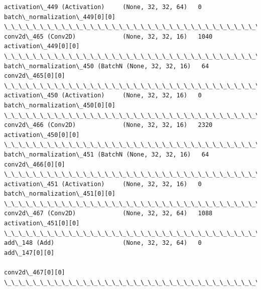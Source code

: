 \documentclass[11pt]{article}
\begin{document}
\begin{Verbatim}[commandchars=\\\{\}]
activation\_449 (Activation)     (None, 32, 32, 64)   0           batch\_normalization\_449[0][0]    
\_\_\_\_\_\_\_\_\_\_\_\_\_\_\_\_\_\_\_\_\_\_\_\_\_\_\_\_\_\_\_\_\_\_\_\_\_\_\_\_\_\_\_\_\_\_\_\_\_\_\_\_\_\_\_\_\_\_\_\_\_\_\_\_\_\_\_\_\_\_\_\_\_\_\_\_\_\_\_\_\_\_\_\_\_\_\_\_\_\_\_\_\_\_\_\_\_\_
conv2d\_465 (Conv2D)             (None, 32, 32, 16)   1040        activation\_449[0][0]             
\_\_\_\_\_\_\_\_\_\_\_\_\_\_\_\_\_\_\_\_\_\_\_\_\_\_\_\_\_\_\_\_\_\_\_\_\_\_\_\_\_\_\_\_\_\_\_\_\_\_\_\_\_\_\_\_\_\_\_\_\_\_\_\_\_\_\_\_\_\_\_\_\_\_\_\_\_\_\_\_\_\_\_\_\_\_\_\_\_\_\_\_\_\_\_\_\_\_
batch\_normalization\_450 (BatchN (None, 32, 32, 16)   64          conv2d\_465[0][0]                 
\_\_\_\_\_\_\_\_\_\_\_\_\_\_\_\_\_\_\_\_\_\_\_\_\_\_\_\_\_\_\_\_\_\_\_\_\_\_\_\_\_\_\_\_\_\_\_\_\_\_\_\_\_\_\_\_\_\_\_\_\_\_\_\_\_\_\_\_\_\_\_\_\_\_\_\_\_\_\_\_\_\_\_\_\_\_\_\_\_\_\_\_\_\_\_\_\_\_
activation\_450 (Activation)     (None, 32, 32, 16)   0           batch\_normalization\_450[0][0]    
\_\_\_\_\_\_\_\_\_\_\_\_\_\_\_\_\_\_\_\_\_\_\_\_\_\_\_\_\_\_\_\_\_\_\_\_\_\_\_\_\_\_\_\_\_\_\_\_\_\_\_\_\_\_\_\_\_\_\_\_\_\_\_\_\_\_\_\_\_\_\_\_\_\_\_\_\_\_\_\_\_\_\_\_\_\_\_\_\_\_\_\_\_\_\_\_\_\_
conv2d\_466 (Conv2D)             (None, 32, 32, 16)   2320        activation\_450[0][0]             
\_\_\_\_\_\_\_\_\_\_\_\_\_\_\_\_\_\_\_\_\_\_\_\_\_\_\_\_\_\_\_\_\_\_\_\_\_\_\_\_\_\_\_\_\_\_\_\_\_\_\_\_\_\_\_\_\_\_\_\_\_\_\_\_\_\_\_\_\_\_\_\_\_\_\_\_\_\_\_\_\_\_\_\_\_\_\_\_\_\_\_\_\_\_\_\_\_\_
batch\_normalization\_451 (BatchN (None, 32, 32, 16)   64          conv2d\_466[0][0]                 
\_\_\_\_\_\_\_\_\_\_\_\_\_\_\_\_\_\_\_\_\_\_\_\_\_\_\_\_\_\_\_\_\_\_\_\_\_\_\_\_\_\_\_\_\_\_\_\_\_\_\_\_\_\_\_\_\_\_\_\_\_\_\_\_\_\_\_\_\_\_\_\_\_\_\_\_\_\_\_\_\_\_\_\_\_\_\_\_\_\_\_\_\_\_\_\_\_\_
activation\_451 (Activation)     (None, 32, 32, 16)   0           batch\_normalization\_451[0][0]    
\_\_\_\_\_\_\_\_\_\_\_\_\_\_\_\_\_\_\_\_\_\_\_\_\_\_\_\_\_\_\_\_\_\_\_\_\_\_\_\_\_\_\_\_\_\_\_\_\_\_\_\_\_\_\_\_\_\_\_\_\_\_\_\_\_\_\_\_\_\_\_\_\_\_\_\_\_\_\_\_\_\_\_\_\_\_\_\_\_\_\_\_\_\_\_\_\_\_
conv2d\_467 (Conv2D)             (None, 32, 32, 64)   1088        activation\_451[0][0]             
\_\_\_\_\_\_\_\_\_\_\_\_\_\_\_\_\_\_\_\_\_\_\_\_\_\_\_\_\_\_\_\_\_\_\_\_\_\_\_\_\_\_\_\_\_\_\_\_\_\_\_\_\_\_\_\_\_\_\_\_\_\_\_\_\_\_\_\_\_\_\_\_\_\_\_\_\_\_\_\_\_\_\_\_\_\_\_\_\_\_\_\_\_\_\_\_\_\_
add\_148 (Add)                   (None, 32, 32, 64)   0           add\_147[0][0]                    
                                                                 conv2d\_467[0][0]                 
\_\_\_\_\_\_\_\_\_\_\_\_\_\_\_\_\_\_\_\_\_\_\_\_\_\_\_\_\_\_\_\_\_\_\_\_\_\_\_\_\_\_\_\_\_\_\_\_\_\_\_\_\_\_\_\_\_\_\_\_\_\_\_\_\_\_\_\_\_\_\_\_\_\_\_\_\_\_\_\_\_\_\_\_\_\_\_\_\_\_\_\_\_\_\_\_\_\_

\end{Verbatim}
\end{document}
